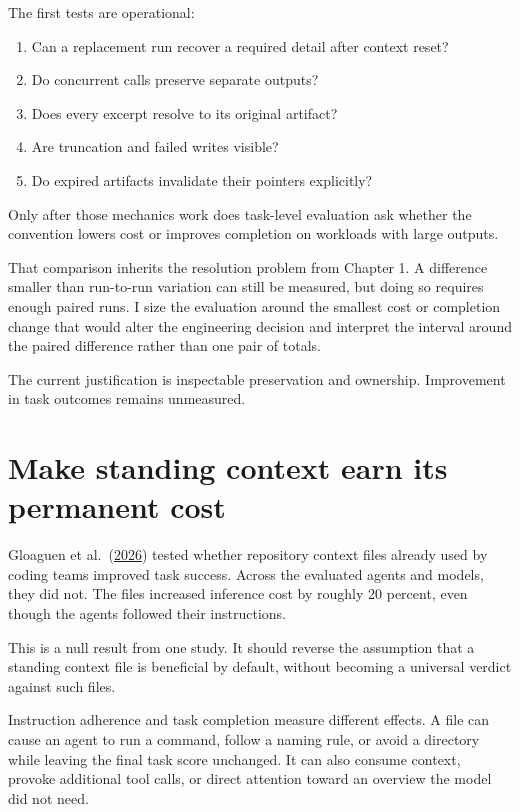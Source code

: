 The first tests are operational:

\begin{enumerate}
\def\labelenumi{\arabic{enumi}.}
\tightlist
\item
  Can a replacement run recover a required detail after context reset?
\item
  Do concurrent calls preserve separate outputs?
\item
  Does every excerpt resolve to its original artifact?
\item
  Are truncation and failed writes visible?
\item
  Do expired artifacts invalidate their pointers explicitly?
\end{enumerate}

Only after those mechanics work does task-level evaluation ask whether the convention lowers cost or improves completion on workloads with large outputs.

That comparison inherits the resolution problem from Chapter 1. A difference smaller than run-to-run variation can still be measured, but doing so requires enough paired runs. I size the evaluation around the smallest cost or completion change that would alter the engineering decision and interpret the interval around the paired difference rather than one pair of totals.

The current justification is inspectable preservation and ownership. Improvement in task outcomes remains unmeasured.

\section{Make standing context earn its permanent cost}\label{make-standing-context-earn-its-permanent-cost}

Gloaguen et al.~(\href{https://arxiv.org/abs/2602.11988}{2026}) tested whether repository context files already used by coding teams improved task success. Across the evaluated agents and models, they did not. The files increased inference cost by roughly 20 percent, even though the agents followed their instructions.

This is a null result from one study. It should reverse the assumption that a standing context file is beneficial by default, without becoming a universal verdict against such files.

Instruction adherence and task completion measure different effects. A file can cause an agent to run a command, follow a naming rule, or avoid a directory while leaving the final task score unchanged. It can also consume context, provoke additional tool calls, or direct attention toward an overview the model did not need.

